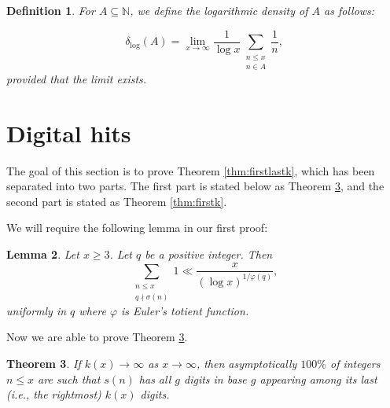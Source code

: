 \documentclass[11pt, reqno]{amsart}
\newtheorem{theorem}{Theorem}
\newtheorem{lemma}[theorem]{Lemma}
\newtheorem{definition}[theorem]{Definition}
\theoremstyle{remark}
\numberwithin{theorem}{section}
\numberwithin{proposition}{section}
\numberwithin{lemma}{section}
\numberwithin{corollary}{section}
\numberwithin{equation}{section}
\numberwithin{conjecture}{section}
\numberwithin{definition}{section}
\begin{document}
\begin{definition} For $A \subseteq \mathbb{N}$, we define the logarithmic density of $A$ as follows:

$$\delta_{\log}(A) = \lim_{x \rightarrow \infty} \frac{1}{\log x} \sum_{\substack{n \leq x \\ n \in A}} \frac{1}{n},$$ provided that the limit exists.
    
\end{definition}



\section{Digital hits}

The goal of this section is to prove Theorem \ref{thm:firstlastk}, which has been separated into two parts. The first part is stated below as Theorem \ref{thm:lastk}, and the second part is stated as Theorem \ref{thm:firstk}.


We will require the following lemma in our first proof:

\begin{lemma}\cite[Lemma 2.1]{Pollack2014}\label{lemma:oldpaper}
		Let $x\geq 3$. Let $q$ be a positive integer. Then 
		$$\sum_{\substack{{n\le x}\\ {q \nmid \sigma (n)}}}1\ll \frac{x}{(\log x)^{1/\varphi(q)}},$$
		uniformly in $q$ where $\varphi$ is Euler's totient function.
        
	\end{lemma} 

Now we are able to prove Theorem \ref{thm:lastk}. 

	\begin{theorem}\label{thm:lastk}
 If $k(x) \to \infty$ as $x\to \infty$, then asymptotically $100\%$ of integers $n\leq x$ are such that $s(n)$ has all $g$ digits in base  $g$ appearing among its last (i.e., the rightmost) $k(x)$ digits. 

	\end{theorem}
\end{document}

